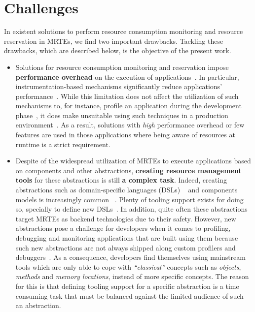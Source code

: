 \section{Challenges}

In existent solutions to perform resource consumption monitoring and resource reservation in MRTEs, we find two important drawbacks.
Tackling these drawbacks, which are described below, is the objective of the present work.

\begin{itemize}
\item Solutions for resource consumption monitoring and reservation impose \textbf{performance overhead} on the execution of applications~\cite{Binder:2006:FEM:1173706.1173733,Marek:2012:DEL:2162037.2162046,Reiss:2008:CDP:1383559.1383566,Maurel:2012:AME:2304736.2304763}.
In particular, instrumentation-based mechanisms significantly reduce applications' performance~\cite{Dmitriev:2004:PJA:974043.974067,czajkowski_jres:_1998,Binder:2009:PPV:1464245.1464249}.
While this limitation does not affect the utilization of such mechanisms to, for instance, profile an application during the development phase~\cite{czajkowski_jres:_1998,binder_extending_2005,binder_portable_2001,Maebe06javana:a,Moret:2011:PBI:1960275.1960292, Hulaas:2008:PTL}, it does make unsuitable using such techniques in a production environment~\cite{Dmitriev:2004:PJA:974043.974067}.
As a result, solutions with \textit{high} performance overhead or few features are used in those applications where being aware of resources at runtime is a strict requirement.

\item Despite of the widespread utilization of MRTEs to execute applications based on components and other abstractions, \textbf{creating resource management tools} for these abstractions is still \textbf{a complex task}.
Indeed, creating abstractions such as domain-specific languages (DSLs) ~\cite{van2000domain,Fowler:2010:DSL:1809745} and components models is increasingly common ~\cite{van2000domain,hutchinson2011empirical,whittle2014state}.
Plenty of tooling support exists for doing so, specially to define new DSLs~\cite{raey,Merkle:2010:TMT:1869542.1869564,Eysholdt:2010:XIY:1869542.1869625}.
In addition, quite often these abstractions target MRTEs as backend technologies due to their safety.
However, new abstractions pose a challenge for developers when it comes to profiling, debugging and monitoring applications that are built using them because such new abstractions are not always shipped along custom profilers and debuggers~\cite{Kolomvatsos:2012:DAC:2148250.2148478,Wu:2008:GGD:1394966.1394970,Mannadiar:2010:DDM:1964571.1964595,Lindeman:2011:DDD:2047862.2047885,Wu:2005:TDL:1094855.1094920,Faith1998}.
As a consequence, developers find themselves using mainstream tools which are only able to cope with \textit{``classical''} concepts such as \textit{objects}, \textit{methods} and \textit{memory locations}, instead of more specific concepts.
The reason for this is that defining tooling support for a specific abstraction is a time consuming task that must be balanced against the limited audience of such an abstraction.
\end{itemize}
 
